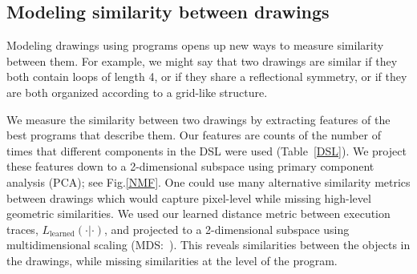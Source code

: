 \documentclass{article}
\begin{document}
\subsection{Modeling similarity between drawings}
Modeling drawings using programs opens up new ways to measure similarity between them.
For example, we might say that two drawings are similar if they both contain loops of length 4,
or if they share a reflectional symmetry,
or if they are both organized according to a grid-like structure.

We measure the similarity between two drawings by extracting features
of the best programs that describe them. Our features are counts of the number of times that different components in the
DSL were used (Table~\ref{DSL}).  We project these features down to a
2-dimensional subspace using primary component analysis
(PCA); see Fig.\ref{NMF}.  One could use many
alternative similarity metrics between drawings which would capture pixel-level while missing high-level geometric similarities.
We used our learned distance metric between execution traces, $L_{\text{learned}}(\cdot|\cdot)$, and projected to a 2-dimensional subspace using multidimensional scaling (MDS:~\cite{cox2008multidimensional}). This reveals similarities between the objects in the drawings,
while missing similarities at the level of the program.
\end{document}
